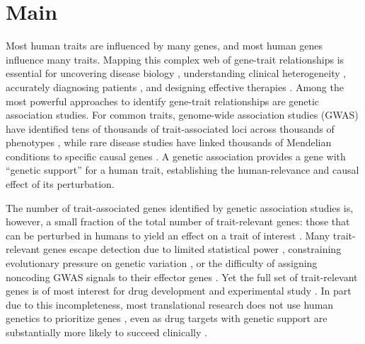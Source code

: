 \section{Main}\label{sec:introduction}


Most human traits are influenced by many genes, and most human genes influence many traits. Mapping this complex web of gene-trait relationships is essential for uncovering disease biology \cite{cohen_sequence_2006}, understanding clinical heterogeneity \cite{udler_type_2018}, accurately diagnosing patients \cite{yang_clinical_2013}, and designing effective therapies \cite{plenge_validating_2013}. Among the most powerful approaches to identify gene-trait relationships are genetic association studies. For common traits, genome-wide association studies (GWAS) have identified tens of thousands of trait-associated loci across thousands of phenotypes \cite{abdellaoui_15_2023}, while rare disease studies have linked thousands of Mendelian conditions to specific causal genes \cite{chung_meta-analysis_2023}. A genetic association provides a gene with ``genetic support'' for a human trait, establishing the human-relevance and causal effect of its perturbation.

The number of trait-associated genes identified by genetic association studies is, however, a small fraction of the total number of trait-relevant genes: those that can be perturbed in humans to yield an effect on a trait of interest \cite{finan_druggable_2017}. Many trait-relevant genes escape detection due to limited statistical power \cite{wang_statistical_2019}, constraining evolutionary pressure on genetic variation \cite{gazal_linkage_2017}, or the difficulty of assigning noncoding GWAS signals to their effector genes \cite{schipper_demystifying_2022,costanzo_realizing_2025}. Yet the full set of trait-relevant genes is of most interest for drug development and experimental study \cite{jhamb_pathway_2019,macnamara_network_2020}. In part due to this incompleteness, most translational research does not use human genetics to prioritize genes \cite{wehling_assessing_2009,dornbos_evaluating_2022}, even as drug targets with genetic support are substantially more likely to succeed clinically \cite{plenge_validating_2013,minikel_refining_2024}.


